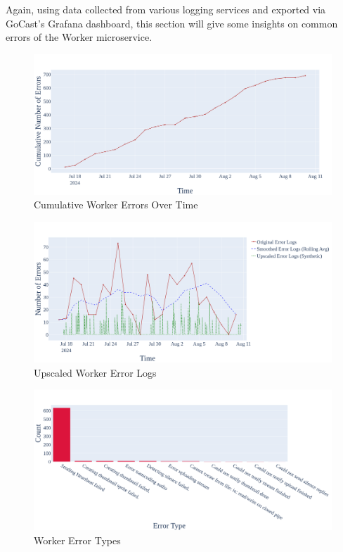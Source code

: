 Again, using data collected from various logging services and exported via GoCast's Grafana dashboard, this section will give some insights on common errors of the Worker microservice.

\begin{figure}[htpb]
    \centering
    \includegraphics[width=\linewidth]{images/plots/worker/cum_errors_over_time.png}
    \caption[Cumulative Worker Errors Over Time]{Cumulative Worker Errors Over Time}\label{fig:worker-cum-errors-over-time}
\end{figure}

\begin{figure}[htpb]
    \centering
    \includegraphics[width=\linewidth]{images/plots/worker/upscaled_error_logs.png}
    \caption[Upscaled Worker Error Logs]{Upscaled Worker Error Logs}\label{fig:worker-upscaled-error-logs}
\end{figure}

\begin{figure}[htpb]
    \centering
    \includegraphics[width=\linewidth]{images/plots/worker/error_types.png}
    \caption[Worker Error Types]{Worker Error Types}\label{fig:worker-error-types}
\end{figure}

